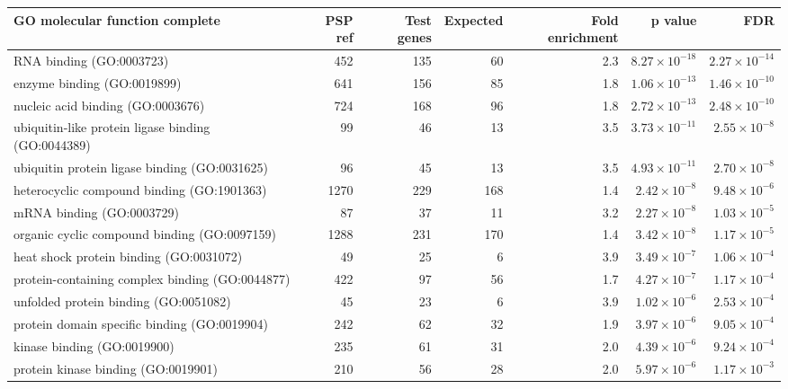 \begin{table}[ht]
\centering
\begin{adjustbox}{width=\textwidth}

\begin{tabular}{lrrrrrr}
  \hline
GO molecular function complete & PSP ref & Test genes & Expected & Fold enrichment & p value & FDR \\ 
  \hline
RNA binding (GO:0003723) & 452 & 135 & 60 & 2.3 & $8.27 \times 10^{-18}$ & $2.27 \times 10^{-14}$ \\ 
  enzyme binding (GO:0019899) & 641 & 156 & 85 & 1.8 & $1.06 \times 10^{-13}$ & $1.46 \times 10^{-10}$ \\ 
  nucleic acid binding (GO:0003676) & 724 & 168 & 96 & 1.8 & $2.72 \times 10^{-13}$ & $2.48 \times 10^{-10}$ \\ 
  ubiquitin-like protein ligase binding (GO:0044389) & 99 & 46 & 13 & 3.5 & $3.73 \times 10^{-11}$ & $2.55 \times 10^{-8}$ \\ 
  ubiquitin protein ligase binding (GO:0031625) & 96 & 45 & 13 & 3.5 & $4.93 \times 10^{-11}$ & $2.70 \times 10^{-8}$ \\ 
  heterocyclic compound binding (GO:1901363) & 1270 & 229 & 168 & 1.4 & $2.42 \times 10^{-8}$ & $9.48 \times 10^{-6}$ \\ 
  mRNA binding (GO:0003729) & 87 & 37 & 11 & 3.2 & $2.27 \times 10^{-8}$ & $1.03 \times 10^{-5}$ \\ 
  organic cyclic compound binding (GO:0097159) & 1288 & 231 & 170 & 1.4 & $3.42 \times 10^{-8}$ & $1.17 \times 10^{-5}$ \\ 
  heat shock protein binding (GO:0031072) & 49 & 25 & 6 & 3.9 & $3.49 \times 10^{-7}$ & $1.06 \times 10^{-4}$ \\ 
  protein-containing complex binding (GO:0044877) & 422 & 97 & 56 & 1.7 & $4.27 \times 10^{-7}$ & $1.17 \times 10^{-4}$ \\ 
  unfolded protein binding (GO:0051082) & 45 & 23 & 6 & 3.9 & $1.02 \times 10^{-6}$ & $2.53 \times 10^{-4}$ \\ 
  protein domain specific binding (GO:0019904) & 242 & 62 & 32 & 1.9 & $3.97 \times 10^{-6}$ & $9.05 \times 10^{-4}$ \\ 
  kinase binding (GO:0019900) & 235 & 61 & 31 & 2.0 & $4.39 \times 10^{-6}$ & $9.24 \times 10^{-4}$ \\ 
  protein kinase binding (GO:0019901) & 210 & 56 & 28 & 2.0 & $5.97 \times 10^{-6}$ & $1.17 \times 10^{-3}$ \\ 

\end{tabular}
\end{adjustbox}
\end{table}
